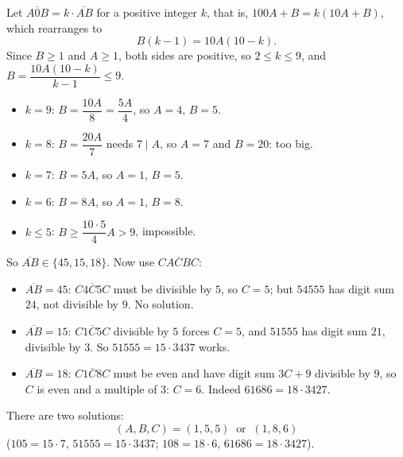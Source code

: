 Let $\overline{A0B}=k\cdot\overline{AB}$ for a positive integer $k$, that is, $100A+B=k(10A+B)$, which rearranges to
\[
B(k-1)=10A(10-k).
\]
Since $B\ge1$ and $A\ge1$, both sides are positive, so $2\le k\le9$, and $B=\dfrac{10A(10-k)}{k-1}\le9$.
\begin{itemize}
\item $k=9$: $B=\dfrac{10A}{8}=\dfrac{5A}{4}$, so $A=4$, $B=5$.
\item $k=8$: $B=\dfrac{20A}{7}$ needs $7\mid A$, so $A=7$ and $B=20$: too big.
\item $k=7$: $B=5A$, so $A=1$, $B=5$.
\item $k=6$: $B=8A$, so $A=1$, $B=8$.
\item $k\le5$: $B\ge\dfrac{10\cdot5}{4}A>9$, impossible.
\end{itemize}
So $\overline{AB}\in\{45,15,18\}$. Now use $\overline{CACBC}$:
\begin{itemize}
\item $\overline{AB}=45$: $\overline{C4C5C}$ must be divisible by $5$, so $C=5$; but $54555$ has digit sum $24$, not divisible by $9$. No solution.
\item $\overline{AB}=15$: $\overline{C1C5C}$ divisible by $5$ forces $C=5$, and $51555$ has digit sum $21$, divisible by $3$. So $51555=15\cdot3437$ works.
\item $\overline{AB}=18$: $\overline{C1C8C}$ must be even and have digit sum $3C+9$ divisible by $9$, so $C$ is even and a multiple of $3$: $C=6$. Indeed $61686=18\cdot3427$.
\end{itemize}
There are two solutions:
\[
\boxed{(A,B,C)=(1,5,5)\ \text{ or }\ (1,8,6)}
\]
($105=15\cdot7$, $51555=15\cdot3437$; $108=18\cdot6$, $61686=18\cdot3427$).
